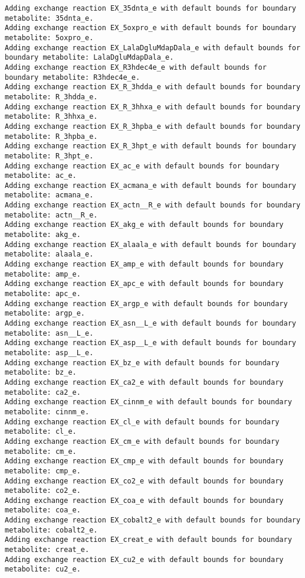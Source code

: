 \documentclass[
  letterpaper,
  DIV=11,
  numbers=noendperiod]{scrartcl}
\begin{document}
\begin{verbatim}
Adding exchange reaction EX_35dnta_e with default bounds for boundary metabolite: 35dnta_e.
Adding exchange reaction EX_5oxpro_e with default bounds for boundary metabolite: 5oxpro_e.
Adding exchange reaction EX_LalaDgluMdapDala_e with default bounds for boundary metabolite: LalaDgluMdapDala_e.
Adding exchange reaction EX_R3hdec4e_e with default bounds for boundary metabolite: R3hdec4e_e.
Adding exchange reaction EX_R_3hdda_e with default bounds for boundary metabolite: R_3hdda_e.
Adding exchange reaction EX_R_3hhxa_e with default bounds for boundary metabolite: R_3hhxa_e.
Adding exchange reaction EX_R_3hpba_e with default bounds for boundary metabolite: R_3hpba_e.
Adding exchange reaction EX_R_3hpt_e with default bounds for boundary metabolite: R_3hpt_e.
Adding exchange reaction EX_ac_e with default bounds for boundary metabolite: ac_e.
Adding exchange reaction EX_acmana_e with default bounds for boundary metabolite: acmana_e.
Adding exchange reaction EX_actn__R_e with default bounds for boundary metabolite: actn__R_e.
Adding exchange reaction EX_akg_e with default bounds for boundary metabolite: akg_e.
Adding exchange reaction EX_alaala_e with default bounds for boundary metabolite: alaala_e.
Adding exchange reaction EX_amp_e with default bounds for boundary metabolite: amp_e.
Adding exchange reaction EX_apc_e with default bounds for boundary metabolite: apc_e.
Adding exchange reaction EX_argp_e with default bounds for boundary metabolite: argp_e.
Adding exchange reaction EX_asn__L_e with default bounds for boundary metabolite: asn__L_e.
Adding exchange reaction EX_asp__L_e with default bounds for boundary metabolite: asp__L_e.
Adding exchange reaction EX_bz_e with default bounds for boundary metabolite: bz_e.
Adding exchange reaction EX_ca2_e with default bounds for boundary metabolite: ca2_e.
Adding exchange reaction EX_cinnm_e with default bounds for boundary metabolite: cinnm_e.
Adding exchange reaction EX_cl_e with default bounds for boundary metabolite: cl_e.
Adding exchange reaction EX_cm_e with default bounds for boundary metabolite: cm_e.
Adding exchange reaction EX_cmp_e with default bounds for boundary metabolite: cmp_e.
Adding exchange reaction EX_co2_e with default bounds for boundary metabolite: co2_e.
Adding exchange reaction EX_coa_e with default bounds for boundary metabolite: coa_e.
Adding exchange reaction EX_cobalt2_e with default bounds for boundary metabolite: cobalt2_e.
Adding exchange reaction EX_creat_e with default bounds for boundary metabolite: creat_e.
Adding exchange reaction EX_cu2_e with default bounds for boundary metabolite: cu2_e.

\end{verbatim}
\end{document}
